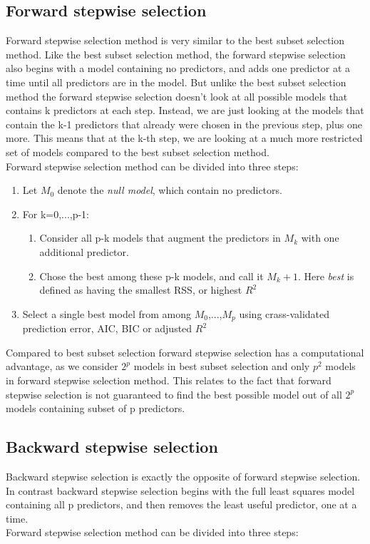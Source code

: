 \subsection{Forward stepwise selection}
Forward stepwise selection method is very similar to the best subset selection method. Like the best subset selection method, the forward stepwise selection also begins with a model containing no predictors, and adds one predictor at a time until all predictors are in the model. But unlike the best subset selection method the forward stepwise selection doesn’t look at all possible models that contains k predictors at each step. Instead, we are just looking at the models that contain the k-1 predictors that already were chosen in the previous step, plus one more. This means that at the k-th step, we are looking at a much more restricted set of models compared to the best subset selection method. \\
Forward stepwise selection method can be divided into three steps:
\begin{enumerate}
	\item Let $M_0$ denote the \textit{null model}, which contain no predictors.
	
	\item For k=0,...,p-1:
	\begin{enumerate}
		\item Consider all p-k models that augment the predictors in $M_k$ with one additional predictor. 
		
		\item Chose the best among these p-k models, and call it $M_k+1$. Here \textit{best} is defined as having the smallest RSS, or highest $R^2$
	\end{enumerate}
	\item Select a single best model from among $M_0$,...,$M_p$ using crass-validated prediction error, AIC, BIC or adjusted $R^2$
\end{enumerate}

Compared to best subset selection forward stepwise selection has a computational advantage, as we consider $2^p$ models in best subset selection and only $p^2$ models in forward stepwise selection method. This relates to the fact that forward stepwise selection is not guaranteed to find the best possible model out of all $2^p$ models containing subset of p predictors. 

\subsection{Backward stepwise selection}
Backward stepwise selection is exactly the opposite of forward stepwise selection. In contrast backward stepwise selection begins with the full least squares model containing all p predictors, and then removes the least useful predictor, one at a time. \\
Forward stepwise selection method can be divided into three steps:

